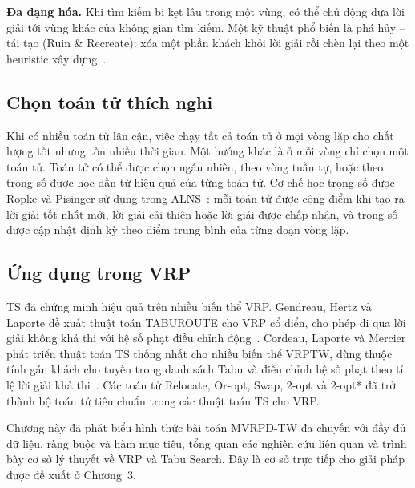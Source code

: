\documentclass[../DoAn.tex]{subfiles}
\begin{document}
\textbf{Đa dạng hóa.} Khi tìm kiếm bị kẹt lâu trong một vùng, có thể chủ động đưa lời giải tới vùng khác của không gian tìm kiếm. Một kỹ thuật phổ biến là phá hủy -- tái tạo (Ruin \& Recreate): xóa một phần khách khỏi lời giải rồi chèn lại theo một heuristic xây dựng~\cite{shaw1998using, schrimpf2000record}.

\subsection{Chọn toán tử thích nghi}

Khi có nhiều toán tử lân cận, việc chạy tất cả toán tử ở mọi vòng lặp cho chất lượng tốt nhưng tốn nhiều thời gian. Một hướng khác là ở mỗi vòng chỉ chọn một toán tử. Toán tử có thể được chọn ngẫu nhiên, theo vòng tuần tự, hoặc theo trọng số được học dần từ hiệu quả của từng toán tử. Cơ chế học trọng số được Ropke và Pisinger sử dụng trong ALNS~\cite{ropke2006adaptive}: mỗi toán tử được cộng điểm khi tạo ra lời giải tốt nhất mới, lời giải cải thiện hoặc lời giải được chấp nhận, và trọng số được cập nhật định kỳ theo điểm trung bình của từng đoạn vòng lặp.

\subsection{Ứng dụng trong VRP}

TS đã chứng minh hiệu quả trên nhiều biến thể VRP. Gendreau, Hertz và Laporte đề xuất thuật toán TABUROUTE cho VRP cổ điển, cho phép đi qua lời giải không khả thi với hệ số phạt điều chỉnh động~\cite{gendreau1994tabu}. Cordeau, Laporte và Mercier phát triển thuật toán TS thống nhất cho nhiều biến thể VRPTW, dùng thuộc tính gán khách cho tuyến trong danh sách Tabu và điều chỉnh hệ số phạt theo tỉ lệ lời giải khả thi~\cite{cordeau2001unified}. Các toán tử Relocate, Or-opt, Swap, 2-opt và 2-opt* đã trở thành bộ toán tử tiêu chuẩn trong các thuật toán TS cho VRP.

\bigskip
Chương này đã phát biểu hình thức bài toán MVRPD-TW đa chuyến với đầy đủ dữ liệu, ràng buộc và hàm mục tiêu, tổng quan các nghiên cứu liên quan và trình bày cơ sở lý thuyết về VRP và Tabu Search. Đây là cơ sở trực tiếp cho giải pháp được đề xuất ở Chương~3.
\end{document}
